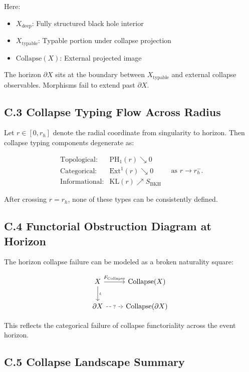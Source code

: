 \documentclass[11pt]{article}
\begin{document}
Here:

\begin{itemize}
    \item \( X_{\text{deep}} \): Fully structured black hole interior
    \item \( X_{\text{typable}} \): Typable portion under collapse projection
    \item \( \mathrm{Collapse}(X) \): External projected image
\end{itemize}

The horizon \( \partial X \) sits at the boundary between \( X_{\text{typable}} \) and external collapse observables. Morphisms fail to extend past \( \partial X \).

\subsection*{C.3 Collapse Typing Flow Across Radius}

Let \( r \in [0, r_h] \) denote the radial coordinate from singularity to horizon. Then collapse typing components degenerate as:

\[
\begin{array}{ll}
\text{Topological:} & \mathrm{PH}_1(r) \searrow 0 \\
\text{Categorical:} & \mathrm{Ext}^1(r) \searrow 0 \\
\text{Informational:} & \mathrm{KL}(r) \nearrow S_{\mathrm{BKH}}
\end{array}
\quad \text{as } r \to r_h^-.
\]

After crossing \( r = r_h \), none of these types can be consistently defined.

\subsection*{C.4 Functorial Obstruction Diagram at Horizon}

The horizon collapse failure can be modeled as a broken naturality square:

\[
\begin{tikzcd}
X \arrow[r, "F_{\text{Collapse}}"] \arrow[d, "\iota"]
& \mathrm{Collapse}(X) \\
\partial X \arrow[r, dashed, "?" description]
& \mathrm{Collapse}(\partial X)
\end{tikzcd}
\]

This reflects the categorical failure of collapse functoriality across the event horizon.

\subsection*{C.5 Collapse Landscape Summary}
\end{document}
